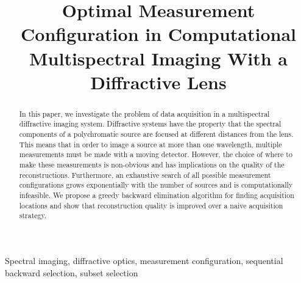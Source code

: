 \documentclass{article}
\title{Optimal Measurement Configuration in Computational \\ Multispectral Imaging With a Diffractive Lens}
\begin{document}
\maketitle

\begin{abstract}

In this paper, we investigate the problem of data acquisition in a multispectral
diffractive imaging system.  Diffractive systems have the property that the
spectral components of a polychromatic source are focused at different distances
from the lens.  This means that in order to image a source at more than one
wavelength, multiple measurements must be made with a moving detector. However,
the choice of where to make these measurements is non-obvious and has
implications on the quality of the reconstructions. Furthermore, an exhaustive
search of all possible measurement configurations grows exponentially with the
number of sources and is computationally infeasible. We propose a greedy
backward elimination algorithm for finding acquisition locations and show that
reconstruction quality is improved over a naive acquisition strategy.
\end{abstract}

\begin{keywords}
Spectral imaging, diffractive optics, measurement configuration, sequential
backward selection, subset selection
\end{keywords}
\end{document}
